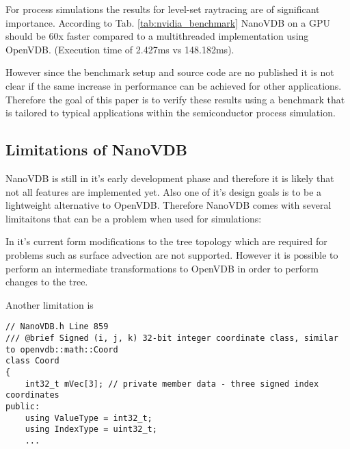 For process simulations the results for level-set raytracing are of significant importance.
According to Tab. \ref{tab:nvidia_benchmark} NanoVDB on a GPU should be 60x faster compared to a multithreaded implementation using OpenVDB. (Execution time of 2.427ms vs 148.182ms).

However since the benchmark setup and source code are no published it is not clear if the same increase in performance can be achieved for other applications.
Therefore the goal of this paper is to verify these results using a benchmark that is tailored to typical applications within the semiconductor process simulation.

\subsection{Limitations of NanoVDB}

NanoVDB is still in it's early development phase and therefore it is likely that not all features are implemented yet.
Also one of it's design goals is to be a lightweight alternative to OpenVDB.
Therefore NanoVDB comes with several limitaitons that can be a problem when used for simulations:

In it's current form modifications to the tree topology which are required for problems such as surface advection are not supported.
However it is possible to perform an intermediate transformations to OpenVDB in order to perform changes to the tree.

Another limitation is

\begin{lstlisting}[caption={NanoVDBs Coord class. Note that datatypes are hardcoded to integers}]
// NanoVDB.h Line 859
/// @brief Signed (i, j, k) 32-bit integer coordinate class, similar to openvdb::math::Coord
class Coord
{
    int32_t mVec[3]; // private member data - three signed index coordinates
public:
    using ValueType = int32_t;
    using IndexType = uint32_t;
	...
\end{lstlisting}



